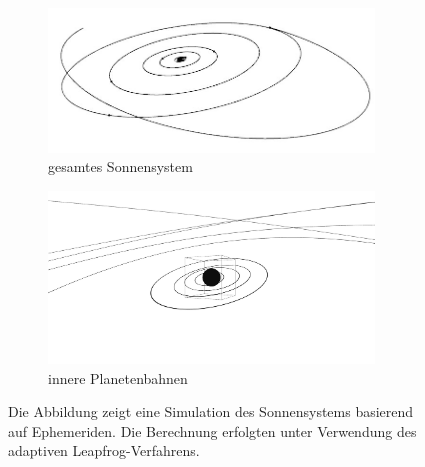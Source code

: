     \begin{figure}[h]
      \center
      \begin{subfigure}[b]{0.49\textwidth}
        \center
        \includegraphics[width=0.95\textwidth]{pictures/solar_system/total.jpg}
        \caption{gesamtes Sonnensystem}
      \end{subfigure}
      \begin{subfigure}[b]{0.49\textwidth}
        \center
        \includegraphics[width=0.95\textwidth]{pictures/solar_system/zoom.jpg}
        \caption{innere Planetenbahnen}
      \end{subfigure}
      \caption{Die Abbildung zeigt eine Simulation des Sonnensystems basierend auf Ephemeriden. Die Berechnung erfolgten unter Verwendung des adaptiven Leapfrog-Verfahrens.}
      \label{fig:solarsystem}
    \end{figure}

